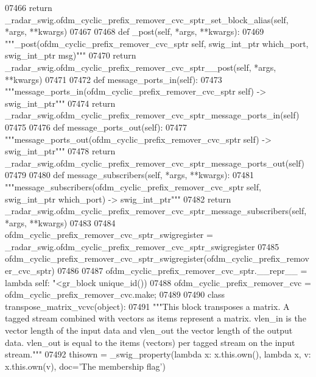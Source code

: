 \begin{DoxyCode}
{{{{{{{{{{{{{{{{{{{{{{{{07466         \textcolor{keywordflow}{return} \_radar\_swig.ofdm\_cyclic\_prefix\_remover\_cvc\_sptr\_set\_block\_alias(self, *args, **kwargs)
07467 
07468     \textcolor{keyword}{def }_post(self, *args, **kwargs):
07469         \textcolor{stringliteral}{"""\_post(ofdm\_cyclic\_prefix\_remover\_cvc\_sptr self, swig\_int\_ptr which\_port, swig\_int\_ptr msg)"""}
07470         \textcolor{keywordflow}{return} \_radar\_swig.ofdm\_cyclic\_prefix\_remover\_cvc\_sptr\_\_post(self, *args, **kwargs)
07471 
07472     \textcolor{keyword}{def }message_ports_in(self):
07473         \textcolor{stringliteral}{"""message\_ports\_in(ofdm\_cyclic\_prefix\_remover\_cvc\_sptr self) -> swig\_int\_ptr"""}
07474         \textcolor{keywordflow}{return} \_radar\_swig.ofdm\_cyclic\_prefix\_remover\_cvc\_sptr\_message\_ports\_in(self)
07475 
07476     \textcolor{keyword}{def }message_ports_out(self):
07477         \textcolor{stringliteral}{"""message\_ports\_out(ofdm\_cyclic\_prefix\_remover\_cvc\_sptr self) -> swig\_int\_ptr"""}
07478         \textcolor{keywordflow}{return} \_radar\_swig.ofdm\_cyclic\_prefix\_remover\_cvc\_sptr\_message\_ports\_out(self)
07479 
07480     \textcolor{keyword}{def }message_subscribers(self, *args, **kwargs):
07481         \textcolor{stringliteral}{"""message\_subscribers(ofdm\_cyclic\_prefix\_remover\_cvc\_sptr self, swig\_int\_ptr which\_port) ->
       swig\_int\_ptr"""}
07482         \textcolor{keywordflow}{return} \_radar\_swig.ofdm\_cyclic\_prefix\_remover\_cvc\_sptr\_message\_subscribers(self, *args, **kwargs)
07483 
07484 ofdm\_cyclic\_prefix\_remover\_cvc\_sptr\_swigregister = 
      \_radar\_swig.ofdm\_cyclic\_prefix\_remover\_cvc\_sptr\_swigregister
07485 ofdm_cyclic_prefix_remover_cvc_sptr_swigregister(ofdm\_cyclic\_prefix\_remover\_cvc\_sptr)
07486 
07487 ofdm\_cyclic\_prefix\_remover\_cvc\_sptr.\_\_repr\_\_ = \textcolor{keyword}{lambda} self: \textcolor{stringliteral}{"<gr\_block %
      unique\_id())
07488 ofdm\_cyclic\_prefix\_remover\_cvc = ofdm\_cyclic\_prefix\_remover\_cvc.make;
07489 
07490 \textcolor{keyword}{class }transpose_matrix_vcvc(object):
07491     \textcolor{stringliteral}{"""This block transposes a matrix. A tagged stream combined with vectors as items represent a matrix.
       vlen\_in is the vector length of the input data and vlen\_out the vector length of the output data. vlen\_out is
       equal to the items (vectors) per tagged stream on the input stream."""}
07492     thisown = _swig_property(\textcolor{keyword}{lambda} x: x.this.own(), \textcolor{keyword}{lambda} x, v: x.this.own(v), doc=\textcolor{stringliteral}{'The membership flag'})
}}}}}}}}}}}}}}}}}}}}}}}}}
\end{DoxyCode}
